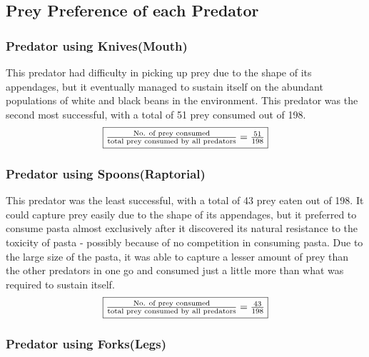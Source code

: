 \documentclass{scrartcl}
\begin{document}
\subsection{Prey Preference of each Predator}
\subsubsection{Predator using Knives(Mouth)}
\begin{center}
\end{center}
This predator had difficulty in picking up prey due to the shape of its appendages, but it eventually managed to sustain itself on the abundant populations of white and black beans in the environment. This predator was the second most successful, with a total of 51 prey consumed out of 198.
\textcolor{red!80!black}{$$\fbox{$
\frac{\text{No. of prey consumed}}{\text{total prey consumed by all predators}} = \frac{51}{198}
$}$$}

\subsubsection{Predator using Spoons(Raptorial)}
\begin{center}
\end{center}

This predator was the least successful, with a total of 43 prey eaten out of 198. It could capture prey easily due to the shape of its appendages, but it preferred to consume pasta almost exclusively after it discovered its natural resistance to the toxicity of pasta - possibly because of no competition in consuming pasta. Due to the large size of the pasta, it was able to capture a lesser amount of prey than the other predators in one go and consumed just a little more than what was required to sustain itself.
\textcolor{red!80!black}{$$\fbox{$
\frac{\text{No. of prey consumed}}{\text{total prey consumed by all predators}} = \frac{43}{198}
$}$$}

\subsubsection[\textcolor{purple}{The Most Successful Predator}]{Predator using Forks(Legs)}
\begin{center}
\end{center}
\end{document}
